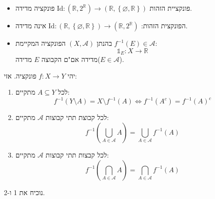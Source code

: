 \documentclass{tstextbook}
\begin{document}
\begin{example}
  \begin{itemize}
    \item פונקציית הזהות \(\mathrm{Id}:\left( \mathbb{R},2^{\mathbb{R}} \right)\to \left( \mathbb{R},\left\{  \varnothing,\mathbb{R}  \right\} \right)\) פונקציה מדידה. 
    \item הפונקצית הזהות: \(\mathrm{Id}:\left( \mathbb{R},\left\{  \varnothing,\mathbb{R}  \right\} \right)\to \left( \mathbb{R}, 2^{\mathbb{R}} \right)\) אינה מדידה.
    \item בהנתן \((X,\mathcal{A})\) הפונקציה המקיימת \(f^{-1} (E)\in \mathcal{A}\):
$$\mathbb{1}_{E}: X\to \mathbb{R}$$
מדידה אם"ם הקבוצה \(E\) מדידה(\(E \in \mathcal{A}\)).
  \end{itemize}
\end{example}
\begin{proposition}
יהי \(f:X\to Y\) פונקציה. אזי:

  \begin{enumerate}
    \item לכל \(A\subseteq Y\) מתקיים: 
$$f^{-1}\left( Y\setminus  A \right)= X\setminus  f^{-1}(A) \iff f^{-1}(A^{c})=f^{-1}(A)^{c}$$


    \item לכל קבוצת תתי קבוצות \(\mathcal{A}\) מתקיים: 
$$f^{-1}\left( \bigcup_{A \in \mathcal{A} }A \right)=\bigcup_{A \in \mathcal{A} }f^{-1}(A)$$


    \item לכל קבצות תתי קבוצות \(\mathcal{A}\) מתקיים: 
$$f^{-1}\left( \bigcap_{A \in \mathcal{A} }A  \right)=\bigcap_{A \in \mathcal{A} }f^{-1}(A)$$


  \end{enumerate}
\end{proposition}
נוכיח את 1 ו-2.
\end{document}
